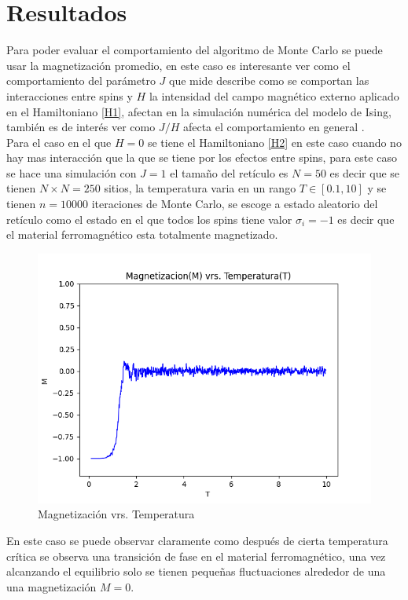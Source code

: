 \documentclass[a4paper]{article}
\begin{document}
\section{Resultados}
Para poder evaluar el comportamiento del algoritmo de Monte Carlo se puede usar la magnetización promedio, en este caso es interesante ver como el comportamiento del parámetro $J$ que mide describe como se comportan las interacciones entre spins y $H$ la intensidad del campo magnético externo aplicado en el Hamiltoniano \ref{H1}, afectan en la simulación numérica del modelo de Ising, también es de interés ver como $J/H$ afecta el comportamiento en general .\\
Para el caso en el que $H=0$ se tiene el Hamiltoniano \ref{H2} en este caso cuando no hay mas interacción que la que se tiene por los efectos entre spins, para este caso se hace una simulación con $J=1$ el tamaño del retículo es $N=50$ es decir que se tienen $N\times N=250$ sitios, la temperatura varia en un rango $T\in[0.1,10]$ y se tienen $n=10000$ iteraciones de Monte Carlo, se escoge a estado aleatorio del retículo como el estado en el que todos los spins tiene valor $\sigma_i=-1$ es decir que el material ferromagnético esta totalmente magnetizado.
\begin{figure}[H]
\begin{center}
\includegraphics[scale=0.6]{PlotMvT_sim1.png} 
\end{center} 
\caption{Magnetización vrs. Temperatura}
\end{figure}
En este caso se puede observar claramente como después de cierta temperatura crítica se observa una transición de fase en el material ferromagnético, una vez alcanzando el equilibrio solo se tienen pequeñas fluctuaciones alrededor de una una magnetización $M=0$.
\end{document}
